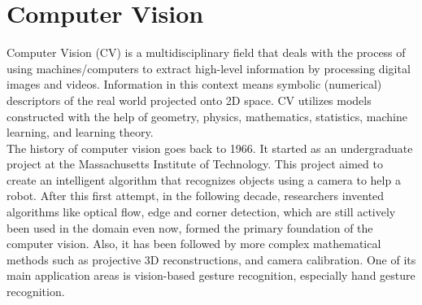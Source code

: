 \section{Computer Vision}
\label{sec:CV}

Computer  Vision (CV) is a multidisciplinary field that deals with the process of using machines/computers to extract high-level information by processing digital images and videos.  Information in this context means symbolic (numerical)  descriptors of the real world projected onto 2D space.  CV utilizes models constructed with the help of geometry, physics, mathematics, statistics, machine learning, and learning theory.\\

The history of computer vision goes back to 1966. It started as an undergraduate project \cite{papert_summer_1966} at the Massachusetts Institute of Technology.  This project aimed to create an intelligent algorithm that recognizes objects using a camera to help a robot. After this first attempt, in the following decade, researchers invented algorithms like optical flow, edge and corner detection,  which are still actively been used in the domain even now, formed the primary foundation of the computer vision. Also, it has been followed by more complex mathematical methods such as projective 3D reconstructions, and camera calibration.  One of its main application areas is vision-based gesture recognition,  especially hand gesture recognition. \\

